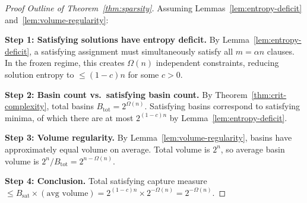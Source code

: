 \documentclass[11pt,a4paper]{article}
\theoremstyle{plain}
\theoremstyle{definition}
\theoremstyle{remark}
\begin{document}
\begin{proof}[Proof Outline of Theorem~\ref{thm:sparsity}]
Assuming Lemmas~\ref{lem:entropy-deficit} and~\ref{lem:volume-regularity}:

\textbf{Step 1: Satisfying solutions have entropy deficit.}
By Lemma~\ref{lem:entropy-deficit}, a satisfying assignment must simultaneously satisfy all $m = \alpha n$ clauses. In the frozen regime, this creates $\Omega(n)$ independent constraints, reducing solution entropy to $\leq (1-c)n$ for some $c > 0$.

\textbf{Step 2: Basin count vs.\ satisfying basin count.}
By Theorem~\ref{thm:crit-complexity}, total basins $B_{\text{tot}} = 2^{\Omega(n)}$.
Satisfying basins correspond to satisfying minima, of which there are at most $2^{(1-c)n}$ by Lemma~\ref{lem:entropy-deficit}.

\textbf{Step 3: Volume regularity.}
By Lemma~\ref{lem:volume-regularity}, basins have approximately equal volume on average. Total volume is $2^n$, so average basin volume is $2^n / B_{\text{tot}} = 2^{n - \Omega(n)}$.

\textbf{Step 4: Conclusion.}
Total satisfying capture measure $\leq B_{\text{sat}} \times (\text{avg volume}) = 2^{(1-c)n} \times 2^{-\Omega(n)} = 2^{-\Omega(n)}$.
\end{proof}
\end{document}
